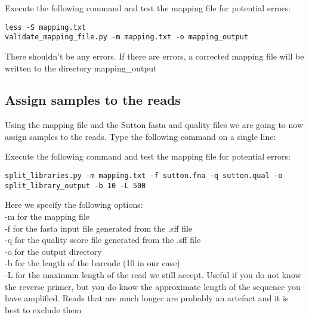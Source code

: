 \begin{steps}
Execute the following command and test the mapping file for potential errors:
\begin{lstlisting}
less -S mapping.txt
validate_mapping_file.py -m mapping.txt -o mapping_output
\end{lstlisting}
\end{steps}

\begin{note}
There shouldn’t be any errors. If there are errors, a corrected mapping file will be written to the directory mapping_output
\end{note}

\subsection{Assign samples to the reads}

\begin{information}
Using the mapping file and the Sutton fasta and quality files we are going to now assign samples to the reads.
Type the following command on a single line:
\end{information}

\begin{steps}
Execute the following command and test the mapping file for potential errors:
\begin{lstlisting}
split_libraries.py -m mapping.txt -f sutton.fna -q sutton.qual -o split_library_output -b 10 -L 500
\end{lstlisting}
\end{steps}

\begin{information}
Here we specify the following options:\\
-m for the mapping file\\
-f for the fasta input file generated from the .sff file\\
-q for the quality score file generated from the .sff file\\
-o for the output directory\\
-b for the length of the barcode (10 in our case)\\
-L for the maximum length of the read we still accept. Useful if you do not know the reverse primer, but you do know the approximate length of the sequence you have amplified. Reads that are much longer are probably an artefact and it is best to exclude them\\
\end{information}


